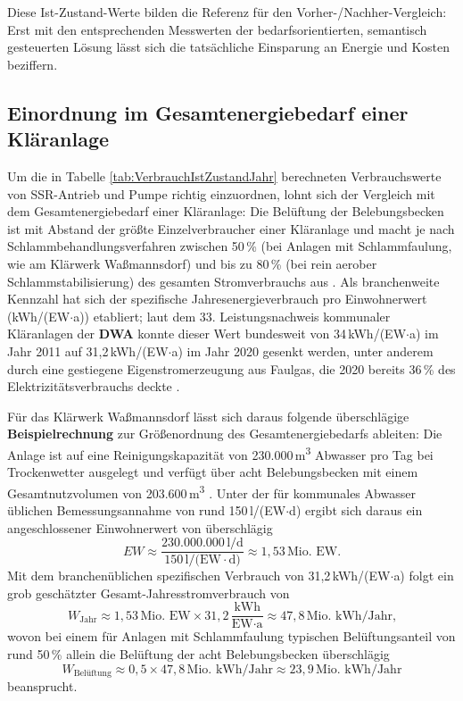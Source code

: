 Diese Ist-Zustand-Werte bilden die Referenz für den Vorher-/Nachher-Vergleich: Erst mit den entsprechenden Messwerten der bedarfsorientierten, semantisch gesteuerten Lösung lässt sich die tatsächliche Einsparung an Energie und Kosten beziffern.

\subsection{Einordnung im Gesamtenergiebedarf einer Kläranlage}
\label{sec:EinordnungEnergiebedarf}

Um die in Tabelle \ref{tab:VerbrauchIstZustandJahr} berechneten Verbrauchswerte von SSR-Antrieb und Pumpe richtig einzuordnen, lohnt sich der Vergleich mit dem Gesamtenergiebedarf einer Kläranlage: Die Belüftung der Belebungsbecken ist mit Abstand der größte Einzelverbraucher einer Kläranlage und macht je nach Schlammbehandlungsverfahren zwischen 50\,\% (bei Anlagen mit Schlammfaulung, wie am Klärwerk Waßmannsdorf) und bis zu 80\,\% (bei rein aerober Schlammstabilisierung) des gesamten Stromverbrauchs aus \cite{Aerzen_2026}. Als branchenweite Kennzahl hat sich der spezifische Jahresenergieverbrauch pro Einwohnerwert (kWh/(EW$\cdot$a)) etabliert; laut dem 33. Leistungsnachweis kommunaler Kläranlagen der \textbf{DWA} konnte dieser Wert bundesweit von 34\,kWh/(EW$\cdot$a) im Jahr 2011 auf 31,2\,kWh/(EW$\cdot$a) im Jahr 2020 gesenkt werden, unter anderem durch eine gestiegene Eigenstromerzeugung aus Faulgas, die 2020 bereits 36\,\% des Elektrizitätsverbrauchs deckte \cite{DWA_2020}.

Für das Klärwerk Waßmannsdorf lässt sich daraus folgende überschlägige \textbf{Beispielrechnung} zur Größenordnung des Gesamtenergiebedarfs ableiten: Die Anlage ist auf eine Reinigungskapazität von 230.000\,m\textsuperscript{3} Abwasser pro Tag bei Trockenwetter ausgelegt und verfügt über acht Belebungsbecken mit einem Gesamtnutzvolumen von 203.600\,m\textsuperscript{3} \cite{BWB_Wassmannsdorf_2017}. Unter der für kommunales Abwasser üblichen Bemessungsannahme von rund 150\,l/(EW$\cdot$d) \cite{Aerzen_2026} ergibt sich daraus ein angeschlossener Einwohnerwert von überschlägig
\begin{equation}
    EW \approx \frac{230.000.000\,\text{l/d}}{150\,\text{l/(EW}\cdot\text{d)}} \approx 1{,}53\,\text{Mio.\ EW.}
\end{equation}
Mit dem branchenüblichen spezifischen Verbrauch von 31,2\,kWh/(EW$\cdot$a) \cite{DWA_2020} folgt ein grob geschätzter Gesamt-Jahresstromverbrauch von
\begin{equation}
    W_{\text{Jahr}} \approx 1{,}53\,\text{Mio.\ EW} \times 31{,}2\,\frac{\text{kWh}}{\text{EW}\cdot\text{a}} \approx 47{,}8\,\text{Mio.\ kWh/Jahr,}
\end{equation}
wovon bei einem für Anlagen mit Schlammfaulung typischen Belüftungsanteil von rund 50\,\% \cite{Aerzen_2026} allein die Belüftung der acht Belebungsbecken überschlägig
\begin{equation}
    W_{\text{Belüftung}} \approx 0{,}5 \times 47{,}8\,\text{Mio.\ kWh/Jahr} \approx 23{,}9\,\text{Mio.\ kWh/Jahr}
\end{equation}
beansprucht.

